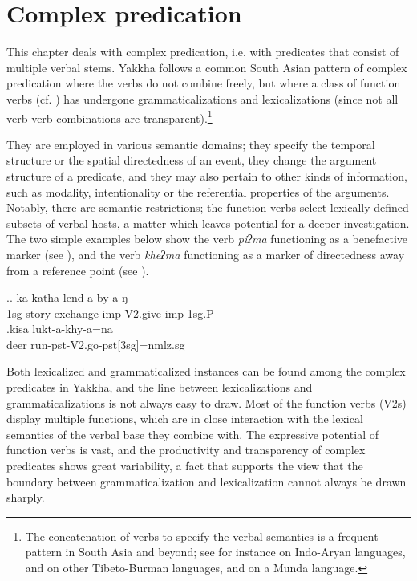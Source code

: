 ﻿\chapter{Complex predication}\label{verb-verb}

This chapter deals with complex predication, i.e. with predicates that consist of multiple verbal  stems. Yakkha follows a common South Asian pattern of complex predication where the verbs do not combine freely, but where  a class of function verbs (cf. \citealt{Schultze-Berndt2006_Taking}) has undergone grammaticalizations and lexicalizations (since not all verb-verb combinations are transparent).\footnote{The concatenation of verbs to specify the verbal semantics is a frequent pattern in South Asia and beyond; see for instance \citet{Butt1995The-structure, Hook1991_Emergence, Masica2001The-definition, Nespital1997Hindi, Pokharel1999Compound} on Indo-Aryan languages, and \citet{Matisoff1969The-syntax, DeLancey1991The-origin,  Bickel1996Aspect, Ebert1997A-grammar, Doornenbal2009A-grammar, Kansakar2005Classical} on other Tibeto-Burman languages, and \citet{Peterson2010_Kharia} on a Munda language.}

 They are employed in various semantic domains; they specify the temporal structure or the spatial directedness of an event, they change the argument structure of a predicate, and  they may also pertain to other kinds of information, such as modality, intentionality or the  referential properties of the arguments. Notably, there are semantic restrictions; the function verbs select lexically defined subsets of verbal hosts, a matter which leaves potential for a deeper investigation. The two simple examples below show the verb \emph{piʔma}  functioning as a benefactive marker (see \Next[a]), and the verb \emph{kheʔma}  functioning as a marker of directedness away from a reference point (see \Next[b]).
 
 	\ex.\ag. ka katha lend-a-by-a-ŋ\\
	{\sc 1sg} story  exchange{\sc -imp-V2.give-imp-1sg.P}\\
	\bg.kisa lukt-a-khy-a=na\\
	deer run{\sc -pst-V2.go-pst[3sg]=nmlz.sg}\\
 
 

Both lexicalized and grammaticalized instances can be found among the complex predicates in Yakkha, and the line between lexicalizations and grammaticalizations is not always easy to draw. Most of the function verbs (V2s) display multiple functions, which are in close interaction with the lexical semantics of the verbal base they combine with. The expressive potential of function verbs is vast, and the productivity and transparency of complex predicates shows great variability, a fact that supports the view that the boundary between grammaticalization and lexicalization cannot always be drawn sharply. 

